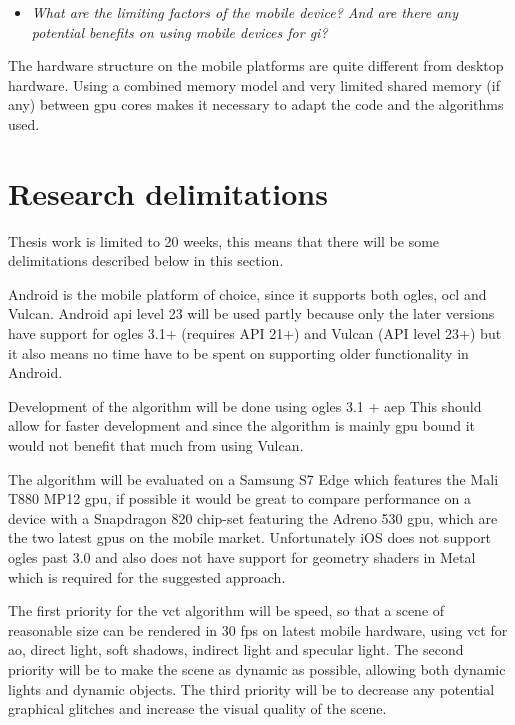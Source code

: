 \documentclass[a4paper, 12pt]{article}
\begin{document}
\begin{itemize}
  \item \textit{What are the limiting factors of the mobile device? And are there any potential benefits on using mobile devices for \gls{gi}?}
\end{itemize}

The hardware structure on the mobile platforms are quite different from desktop hardware. Using a combined memory model and very limited shared memory (if any) between \gls{gpu} cores makes it necessary to adapt the code and the algorithms used.

\section{Research delimitations}
\label{sec:delimitations}

Thesis work is limited to 20 weeks, this means that there will be some delimitations described below in this section.

Android is the mobile platform of choice, since it supports both \gls{ogles}, \gls{ocl} and Vulcan. Android \acrshort{api} level 23 will be used partly because only the later versions have support for \gls{ogles} 3.1+ (requires API 21+) and Vulcan (API level 23+) but it also means no time have to be spent on supporting older functionality in Android.

Development of the algorithm will be done using \gls{ogles} 3.1 + \gls{aep} This should allow for faster development and since the algorithm is mainly \gls{gpu} bound it would not benefit that much from using Vulcan.

The algorithm will be evaluated on a Samsung S7 Edge which features the Mali T880 MP12 \gls{gpu}, if possible it would be great to compare performance on a device with a Snapdragon 820 chip-set featuring the Adreno 530 \gls{gpu}, which are the two latest \glspl{gpu} on the mobile market. Unfortunately iOS does not support \gls{ogles} past 3.0 and also does not have support for geometry shaders in Metal which is required for the suggested approach.

The first priority for the \gls{vct} algorithm will be speed, so that a scene of reasonable size can be rendered in 30 fps on latest mobile hardware, using \gls{vct} for \gls{ao}, direct light, soft shadows, indirect light and specular light. The second priority will be to make the scene as dynamic as possible, allowing both dynamic lights and dynamic objects. The third priority will be to decrease any potential graphical glitches and increase the visual quality of the scene. 
\end{document}
